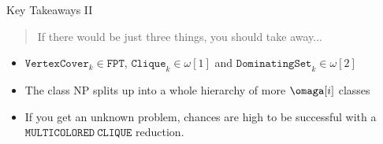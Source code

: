 \begin{frame}[c]{Key Takeaways II}
\begin{center}
\begin{quote}
    If there would be just three things, you should take away...
\end{quote}
\begin{itemize}
    \item $\mathtt{Vertex Cover}_k \in \mathtt{FPT}$,  $\mathtt{Clique}_k \in \omega[1]$ and  $\mathtt{Dominating Set}_k \in \omega[2]$
    \item The class NP splits up into a whole hierarchy of more  $\omaga[i]$ classes
    \item If you get an unknown problem, chances are high to be successful  with a $\mathtt{MULTICOLORED~CLIQUE}$ reduction.
\end{itemize}
\end{center}
\end{frame}

